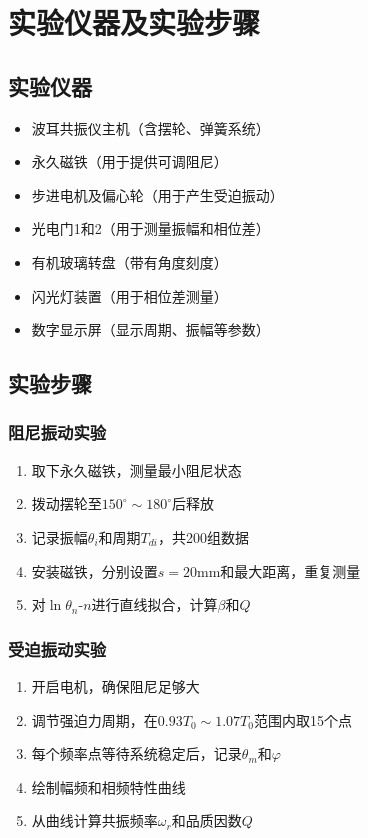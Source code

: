 \documentclass[UTF8]{ctexart}
\begin{document}
\section{实验仪器及实验步骤}
\subsection{实验仪器}
\begin{itemize}
\item 波耳共振仪主机（含摆轮、弹簧系统）
\item 永久磁铁（用于提供可调阻尼）
\item 步进电机及偏心轮（用于产生受迫振动）
\item 光电门1和2（用于测量振幅和相位差）
\item 有机玻璃转盘（带有角度刻度）
\item 闪光灯装置（用于相位差测量）
\item 数字显示屏（显示周期、振幅等参数）
\end{itemize}

\subsection{实验步骤}
\subsubsection{阻尼振动实验}
\begin{enumerate}
\item 取下永久磁铁，测量最小阻尼状态
\item 拨动摆轮至$150^\circ \sim 180^\circ$后释放
\item 记录振幅$\theta_i$和周期$T_{di}$，共200组数据
\item 安装磁铁，分别设置$s=20$mm和最大距离，重复测量
\item 对$\ln\theta_n$-$n$进行直线拟合，计算$\beta$和$Q$
\end{enumerate}

\subsubsection{受迫振动实验}
\begin{enumerate}
\item 开启电机，确保阻尼足够大
\item 调节强迫力周期，在$0.93T_0 \sim 1.07T_0$范围内取15个点
\item 每个频率点等待系统稳定后，记录$\theta_m$和$\varphi$
\item 绘制幅频和相频特性曲线
\item 从曲线计算共振频率$\omega_r$和品质因数$Q$
\end{enumerate}
\end{document}
